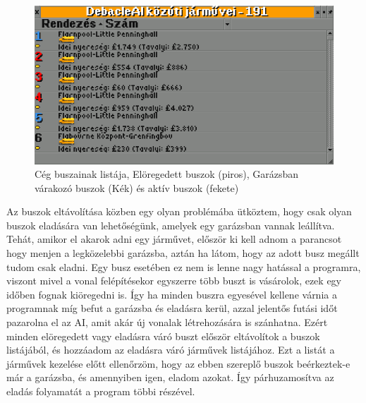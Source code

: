 \begin{figure}[h!]
	\centering
	\includegraphics[width=\textwidth]{images/buszok.png}
	\caption{Cég buszainak listája, Elöregedett buszok (piros), Garázsban várakozó buszok (Kék) és aktív buszok (fekete)}
	\label{fig:vonal}
\end{figure}

Az buszok eltávolítása közben egy olyan problémába ütköztem, hogy csak olyan buszok eladására van lehetőségünk, amelyek egy garázsban vannak leállítva. Tehát, amikor el akarok adni egy járművet, először ki kell adnom a parancsot hogy menjen a legközelebbi garázsba, aztán ha látom, hogy az adott busz megállt tudom csak eladni. Egy busz esetében ez nem is lenne nagy hatással a programra, viszont mivel a vonal felépítésekor egyszerre több buszt is vásárolok, ezek egy időben fognak kiöregedni is. Így ha minden buszra egyesével kellene várnia a programnak míg befut a garázsba és eladásra kerül, azzal jelentős futási időt pazarolna el az AI, amit akár új vonalak létrehozására is szánhatna. Ezért minden elöregedett vagy eladásra váró buszt először eltávolítok a buszok listájából, és hozzáadom az eladásra váró járművek listájához. Ezt a listát a járművek kezelése előtt ellenőrzöm, hogy az ebben szereplő buszok beérkeztek-e már a garázsba, és amennyiben igen, eladom azokat. Így párhuzamosítva az eladás folyamatát a program többi részével.
